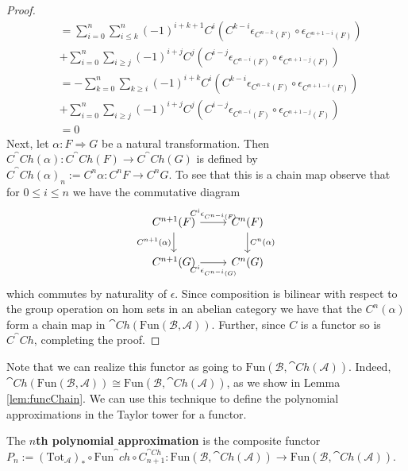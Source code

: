 \begin{proof}
\begin{align*}
        &= \sum_{i=0}^n\sum_{i\leq k}^n(-1)^{i+k+1}C^{i}\left(C^{k-i}\epsilon_{C^{n-k}(F)}\circ \epsilon_{C^{n+1-i}(F)}\right) \tag{Naturality of $\epsilon$} \\
        &+ \sum_{i=0}^n\sum_{i\geq j}(-1)^{i+j}C^j\left(C^{i-j}\epsilon_{C^{n-i}(F)}\circ \epsilon_{C^{n+1-j}(F)} \right)\\ 
        &= -\sum_{k=0}^n\sum_{k\geq i}(-1)^{i+k}C^{i}\left(C^{k-i}\epsilon_{C^{n-k}(F)}\circ \epsilon_{C^{n+1-i}(F)}\right) \tag{Re-ordering the sum} \\
        &+ \sum_{i=0}^n\sum_{i\geq j}(-1)^{i+j}C^j\left(C^{i-j}\epsilon_{C^{n-i}(F)}\circ \epsilon_{C^{n+1-j}(F)} \right) \\
        &= 0
    \end{align*}
    Next, let $\alpha:F\Rightarrow G$ be a natural transformation. Then $C^\cat{Ch}(\alpha):C^\cat{Ch}(F)\rightarrow C^\cat{Ch}(G)$ is defined by $C^\cat{Ch}(\alpha)_n:= C^n\alpha:C^nF\rightarrow C^nG$. To see that this is a chain map observe that for $0 \leq i \leq n$ we have the commutative diagram
    \[\begin{tikzcd}
    	{C^{n+1}(F)} & {C^n(F)} \\
    	{C^{n+1}(G)} & {C^n(G)}
    	\arrow["{C^i\epsilon_{C^{n-i}(F)}}", from=1-1, to=1-2]
    	\arrow["{C^n(\alpha)}", from=1-2, to=2-2]
    	\arrow["{C^{n+1}(\alpha)}"', from=1-1, to=2-1]
    	\arrow["{C^i\epsilon_{C^{n-i}(G)}}"', from=2-1, to=2-2]
    \end{tikzcd}\]
    which commutes by naturality of $\epsilon$. Since composition is bilinear with respect to the group operation on hom sets in an abelian category we have that the $C^n(\alpha)$ form a chain map in $\cat{Ch}(\text{Fun}(\mathcal{B},\mathcal{A}))$. Further, since $C$ is a functor so is $C^\cat{Ch}$, completing the proof.
\end{proof}

Note that we can realize this functor as going to $\text{Fun}(\mathcal{B},\cat{Ch}(\mathcal{A}))$. Indeed, $\cat{Ch}(\text{Fun}(\mathcal{B},\mathcal{A}))\cong \text{Fun}(\mathcal{B},\cat{Ch}(\mathcal{A}))$, as we show in Lemma \ref{lem:funcChain}. We can use this technique to define the polynomial approximations in the Taylor tower for a functor.

\begin{defn}[label=defn:4.2]{}
    The \textbf{$n$th polynomial approximation} is the composite functor $P_n := (\text{Tot}_\mathcal{A})_*\circ \text{Fun}^\cat{ch}\circ C_{n+1}^{\cat{Ch}}:\text{Fun}(\mathcal{B},\cat{Ch}(\mathcal{A}))\rightarrow \text{Fun}(\mathcal{B},\cat{Ch}(\mathcal{A}))$. 
\end{defn}


